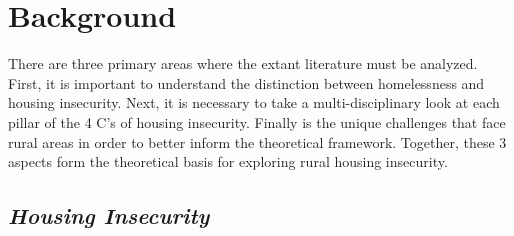 \chapter{Background}	%


There are three primary areas where the extant literature must be analyzed. First,  it is important to understand the distinction between homelessness and housing insecurity. Next, it is necessary to take a multi-disciplinary look at each pillar of the 4 C's of housing insecurity. Finally is the unique challenges that face rural areas in order to better inform the theoretical framework. Together, these 3 aspects form the theoretical basis for exploring rural housing insecurity.

\section{\textit{Housing Insecurity}}


